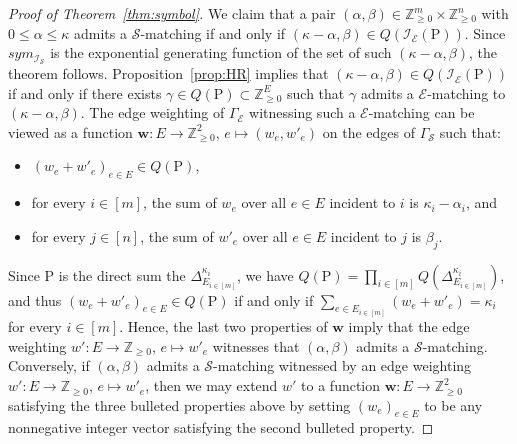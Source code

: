\documentclass{amsart}
\newcommand{\ZZ}{\mathbb Z}
\renewcommand{\P}{\mathrm{P}}
\theoremstyle{plain}
\theoremstyle{definition}
\begin{document}
\begin{proof}[Proof of Theorem~\ref{thm:symbol}]
We claim that a pair $(\alpha,\beta)\in \ZZ_{\geq 0}^m \times \ZZ_{\geq 0}^n$ with $0\leq \alpha\leq \kappa$ admits a $\mathcal S$-matching if and only if $(\kappa-\alpha, \beta) \in Q(\mathcal I_{\mathcal E}(\P))$.
Since $sym_{\mathcal I_{\mathcal S}}$ is the exponential generating function of the set of such $(\kappa-\alpha,\beta)$, the theorem follows.
Proposition~\ref{prop:HR} implies that $(\kappa-\alpha, \beta) \in Q(\mathcal I_{\mathcal E}(\P))$ if and only if there exists $\gamma \in Q(\P) \subset \ZZ_{\geq 0}^E$ such that $\gamma$ admits a $\mathcal E$-matching to $(\kappa-\alpha, \beta)$.
The edge weighting of $\Gamma_{\mathcal E}$ witnessing such a $\mathcal E$-matching can be viewed as a function $\mathbf w: E \to \ZZ_{\geq 0}^2$, $e \mapsto (w_e, w'_e)$ on the edges of $\Gamma_{\mathcal S}$ such that:
\begin{itemize}
\item $(w_e + w'_e)_{e\in E} \in Q(\P)$, 
\item for every $i\in [m]$, the sum of $w_e$ over all $e\in E$ incident to $i$ is $\kappa_i-\alpha_i$, and
\item for every $j\in [n]$, the sum of $w'_e$ over all $e\in E$ incident to $j$ is $\beta_j$.
\end{itemize}
Since $\P$ is the direct sum the $\Delta^{\kappa_i}_{E_{i\in [m]}}$, we have $Q(\P) = \prod_{i\in [m]} Q(\Delta^{\kappa_i}_{E_{i\in [m]}})$, and thus $(w_e + w'_e)_{e\in E} \in Q(\P)$ if and only if $\sum_{e\in E_{i\in [m]}} (w_e + w'_e) = \kappa_i$ for every $i\in [m]$.  Hence, the last two properties of $\mathbf w$ imply that the edge weighting $w': E \to \ZZ_{\geq 0}$, $e\mapsto w'_e$ witnesses that $(\alpha,\beta)$ admits a $\mathcal S$-matching.
Conversely, if $(\alpha,\beta)$ admits a $\mathcal S$-matching witnessed by an edge weighting $w': E \to \ZZ_{\geq 0}$, $e\mapsto w'_e$, then we may extend $w'$ to a function $\mathbf w: E \to \ZZ_{\geq 0}^2$ satisfying the three bulleted properties above by setting $(w_e)_{e\in E}$ to be any nonnegative integer vector satisfying the second bulleted property.
\end{proof}
\end{document}
